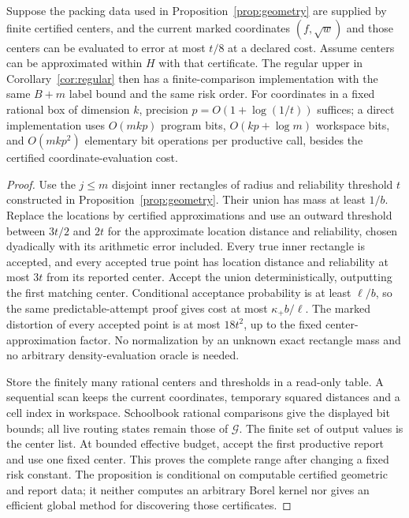 \begin{proposition}\label{prop:finite-cells}
Suppose the packing data used in Proposition~\ref{prop:geometry} are supplied by finite certified centers, and the current marked coordinates $(f,\sqrt w)$ and those centers can be evaluated to error at most $t/8$ at a declared cost. Assume centers can be approximated within $H$ with that certificate. The regular upper in Corollary~\ref{cor:regular} then has a finite-comparison implementation with the same $B+m$ label bound and the same risk order. For coordinates in a fixed rational box of dimension $k$, precision $p=O(1+\log(1/t))$ suffices; a direct implementation uses $O(mkp)$ program bits, $O(kp+\log m)$ workspace bits, and $O(mkp^2)$ elementary bit operations per productive call, besides the certified coordinate-evaluation cost.
\end{proposition}
\begin{proof}
Use the $j\le m$ disjoint inner rectangles of radius and reliability threshold $t$ constructed in Proposition~\ref{prop:geometry}. Their union has mass at least $1/b$. Replace the locations by certified approximations and use an outward threshold between $3t/2$ and $2t$ for the approximate location distance and reliability, chosen dyadically with its arithmetic error included. Every true inner rectangle is accepted, and every accepted true point has location distance and reliability at most $3t$ from its reported center. Accept the union deterministically, outputting the first matching center. Conditional acceptance probability is at least $\ell/b$, so the same predictable-attempt proof gives cost at most $\kappa_+b/\ell$. The marked distortion of every accepted point is at most $18t^2$, up to the fixed center-approximation factor. No normalization by an unknown exact rectangle mass and no arbitrary density-evaluation oracle is needed.

Store the finitely many rational centers and thresholds in a read-only table. A sequential scan keeps the current coordinates, temporary squared distances and a cell index in workspace. Schoolbook rational comparisons give the displayed bit bounds; all live routing states remain those of $\mathcal G$. The finite set of output values is the center list. At bounded effective budget, accept the first productive report and use one fixed center. This proves the complete range after changing a fixed risk constant. The proposition is conditional on computable certified geometric and report data; it neither computes an arbitrary Borel kernel nor gives an efficient global method for discovering those certificates.
\end{proof}

